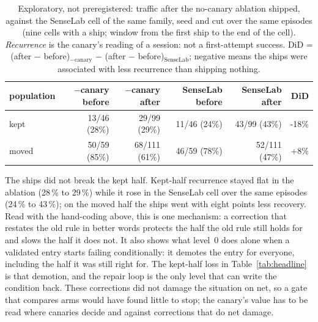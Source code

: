 \documentclass[11pt]{article}
\begin{document}
\begin{table}[H]
\centering\scriptsize\setlength{\tabcolsep}{3pt}
\begin{tabular}{lrrrrr}
\toprule
\textbf{population} & \textbf{$-$canary before} & \textbf{$-$canary after} & \textbf{SenseLab before} & \textbf{SenseLab after} & \textbf{DiD} \\
\midrule
kept & 13/46 (28\%) & 29/99 (29\%) & 11/46 (24\%) & 43/99 (43\%) & -18\% \\
moved & 50/59 (85\%) & 68/111 (61\%) & 46/59 (78\%) & 52/111 (47\%) & +8\% \\
\bottomrule
\end{tabular}
\caption{Exploratory, not preregistered: traffic after the no-canary ablation shipped, against the SenseLab cell of the same family, seed and cut over the same episodes (nine cells with a ship; window from the first ship to the end of the cell). \emph{Recurrence} is the canary's reading of a session: not a first-attempt success. DiD = (after $-$ before)$_{-\text{canary}}$ $-$ (after $-$ before)$_{\text{SenseLab}}$; negative means the ships were associated with less recurrence than shipping nothing.}
\label{tab:posthoc}
\end{table}


The ships did not break the kept half. Kept-half recurrence stayed flat in the ablation (28\,\%
to 29\,\%) while it rose in the SenseLab cell over the same episodes (24\,\% to 43\,\%); on the
moved half the ships went with eight points less recovery. Read with the hand-coding above, this
is one mechanism: a correction that restates the old rule in better words protects the half the
old rule still holds for and slows the half it does not. It also shows what level~0 does alone
when a validated entry starts failing conditionally: it demotes the entry for everyone,
including the half it was still right for. The kept-half loss in Table~\ref{tab:headline} is
that demotion, and the repair loop is the only level that can write the condition back. These
corrections did not damage the situation on net, so a gate that compares arms would have found
little to stop; the canary's value has to be read where canaries decide and against corrections
that do net damage.
\end{document}
